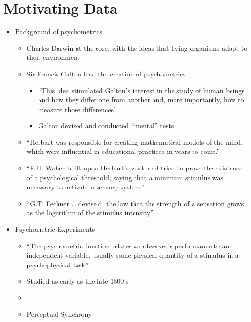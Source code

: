 \documentclass[
]{article}
\providecommand{\tightlist}{%
  \setlength{\itemsep}{0pt}\setlength{\parskip}{0pt}}
\begin{document}
\hypertarget{motivating-data}{%
\section{Motivating Data}\label{motivating-data}}

\begin{itemize}
\tightlist
\item
  Background of psychometrics

  \begin{itemize}
  \tightlist
  \item
    Charles Darwin at the core, with the ideas that living organisms adapt to their environment
  \item
    Sir Francis Galton lead the creation of psychometrics

    \begin{itemize}
    \tightlist
    \item
      ``This idea stimulated Galton's interest in the study of human beings and how they differ one from another and, more importantly, how to measure those differences''
    \item
      Galton devised and conducted ``mental'' tests
    \end{itemize}
  \item
    ``Herbart was responsible for creating mathematical models of the mind, which were influential in educational practices in years to come.''
  \item
    ``E.H. Weber built upon Herbart's work and tried to prove the existence of a psychological threshold, saying that a minimum stimulus was necessary to activate a sensory system''
  \item
    ``G.T. Fechner \ldots{} devise{[}d{]} the law that the strength of a sensation grows as the logarithm of the stimulus intensity''
  \end{itemize}
\item
  Psychometric Experiments

  \begin{itemize}
  \tightlist
  \item
    ``The psychometric function relates an observer's performance to an independent variable, usually some physical quantity of a stimulus in a psychophysical task'' \citep{wichmann2001a}
  \item
    Studied as early as the late 1800's
  \item
    \citep{boring1917chart}
  \item
    Perceptual Synchrony


\end{itemize}
\end{itemize}
\end{document}

